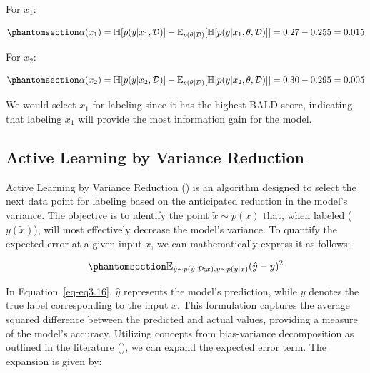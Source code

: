 \documentclass[
  letterpaper,
  numbers=noenddot,
  DIV=11]{scrreprt}
\theoremstyle{definition}
\theoremstyle{plain}
\theoremstyle{plain}
\theoremstyle{remark}
\begin{document}
For \(x_1\):

\begin{equation}\phantomsection\label{eq-eq3.14}{
\alpha(x_1) = \mathbb{H}[p(y|x_1, \mathcal{D})] - \mathbb{E}_{p(\theta|\mathcal{D})}[\mathbb{H}[p(y|x_1, \theta, \mathcal{D})]] = 0.27 - 0.255 = 0.015
}\end{equation}

For \(x_2\):

\begin{equation}\phantomsection\label{eq-eq3.15}{
\alpha(x_2) = \mathbb{H}[p(y|x_2, \mathcal{D})] - \mathbb{E}_{p(\theta|\mathcal{D})}[\mathbb{H}[p(y|x_2, \theta, \mathcal{D})]] = 0.30 - 0.295 = 0.005
}\end{equation}

We would select \(x_1\) for labeling since it has the highest BALD
score, indicating that labeling \(x_1\) will provide the most
information gain for the model.

\subsection{Active Learning by Variance
Reduction}\label{active-learning-by-variance-reduction}

Active Learning by Variance Reduction () is an algorithm designed to select the
next data point for labeling based on the anticipated reduction in the
model's variance. The objective is to identify the point
\(\tilde{x} \sim p(x)\) that, when labeled (\(y(\tilde{x})\)), will most
effectively decrease the model's variance. To quantify the expected
error at a given input \(x\), we can mathematically express it as
follows:

\begin{equation}\phantomsection\label{eq-eq3.16}{
\mathbb{E}_{\hat{y} \sim p(\hat{y} | \mathcal{D}; x), y \sim p(y|x)} (\hat{y} - y)^2
}\end{equation}

In Equation~\ref{eq-eq3.16}, \(\hat{y}\) represents the model's
prediction, while \(y\) denotes the true label corresponding to the
input \(x\). This formulation captures the average squared difference
between the predicted and actual values, providing a measure of the
model's accuracy. Utilizing concepts from bias-variance decomposition as
outlined in the literature
(), we can expand the expected error term. The expansion is given
by:
\end{document}

